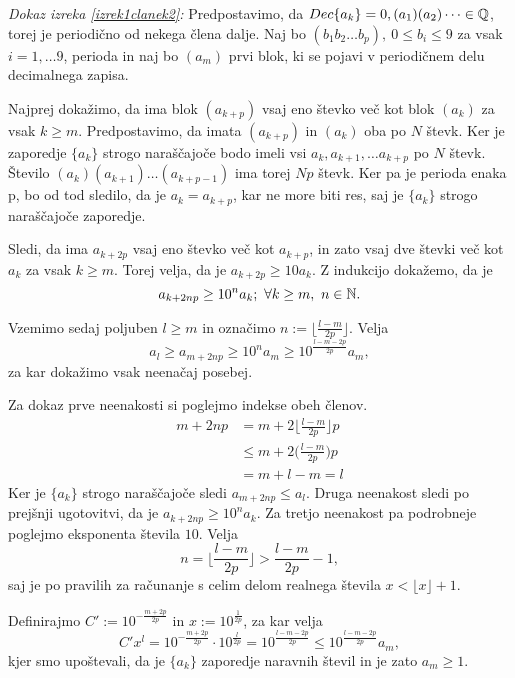 \documentclass[twoside,11pt]{article}
\begin{document}
\QED

\noindent
{\em Dokaz izreka \ref{izrek1clanek2}:\/} Predpostavimo, da $Dec\{a_k\} = 0,(a_1)(a_2)\dots \in \mathbb{Q}$,
 torej je periodično od nekega člena dalje. Naj bo
$(b_1b_2 \dots b_p), \ 0 \leq b_i \leq 9$ za vsak $i = 1, \dots 9$, perioda in naj bo
$(a_m)$ prvi blok, ki se pojavi v periodičnem delu decimalnega zapisa.

Najprej dokažimo, da ima blok $(a_{k+p})$ vsaj eno števko več kot blok $(a_k)$ za vsak $k \geq m$.
Predpostavimo, da imata $(a_{k+p})$ in $(a_k)$ oba po $N$ števk. 
Ker je zaporedje $\{a_k\}$ strogo naraščajoče bodo imeli vsi $a_k, a_{k+1}, \dots a_{k+p}$ po $N$ števk.
Število $(a_k)(a_{k+1})\dots (a_{k+p-1})$ ima torej $Np$ števk. Ker pa je perioda enaka p,
bo od tod sledilo, da je $a_k = a_{k+p}$, kar ne more biti res, saj je $\{a_k\}$ strogo naraščajoče zaporedje.

Sledi, da ima $a_{k+ 2p}$ vsaj eno števko več kot $a_{k+p}$, in zato vsaj dve števki več kot $a_k$
za vsak $k \geq m$.
Torej velja, da je $a_{k+2p} \geq 10 a_k$. Z indukcijo dokažemo, da je 
\[ a_{k+2np} \geq 10^n a_k; \ \forall k \geq m, \ n \in \mathbb{N}.\]

Vzemimo sedaj poljuben $l \geq m$ in označimo $n := \lfloor \frac{l-m}{2p} \rfloor$.
Velja 
\begin{equation}\label{enacba1}
    a_l \geq a_{m+2np} \geq 10^n a_m \geq 10 ^{\frac{l-m-2p}{2p}}a_m,
\end{equation}
za kar dokažimo vsak neenačaj posebej.

Za dokaz prve neenakosti si poglejmo indekse obeh členov. 
\[
    \begin{split}
    m + 2np &= m + 2 \bigg\lfloor \frac{l-m}{2p}\bigg\rfloor p \\
    &\leq m + 2\bigg(\frac{l-m}{2p}\bigg)p \\
    &= m + l - m = l
    \end{split}
    \] 
Ker je $\{a_k\}$ strogo naraščajoče sledi $a_{m+2np} \leq a_l$.
Druga neenakost sledi po prejšnji ugotovitvi, da je $a_{k+2np} \geq 10^n a_k$.
Za tretjo neenakost pa podrobneje poglejmo eksponenta števila $10$. Velja
\[
    n = \bigg\lfloor \frac{l-m}{2p}\bigg\rfloor > \frac{l-m}{2p} - 1,
     \]
saj je po pravilih za računanje s celim delom realnega števila $x < \lfloor x\rfloor + 1$.

Definirajmo $C' := 10^{-\frac{m + 2p}{2p}}$ in $x := 10^{\frac{1}{2p}}$, za kar velja
\begin{equation}\label{enacba2}
     C'x^l = 10^{-\frac{m + 2p}{2p}} \cdot 10^{\frac{l}{2p}} = 10 ^{\frac{l-m-2p}{2p}}
     \leq 10 ^{\frac{l-m-2p}{2p}} a_m,
\end{equation}
kjer smo upoštevali, da je $\{a_k\}$ zaporedje naravnih števil in je zato $a_m \geq 1$.
\end{document}
